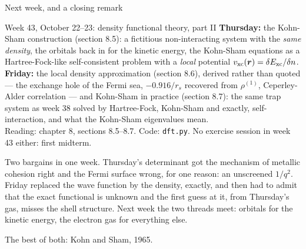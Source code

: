 \documentclass[aspectratio=169,10pt]{beamer}
\begin{document}
\begin{frame}{Next week, and a closing remark}
  \begin{exampleblock}{Week 43, October 22--23: density functional theory, part II}
    \small
    \textbf{Thursday:} the Kohn-Sham construction (section 8.5): a fictitious non-interacting system with the \emph{same density}, the orbitals back in for the kinetic energy, the Kohn-Sham equations as a Hartree-Fock-like self-consistent problem with a \emph{local} potential $v_{\rm xc}(\bm r)=\delta E_{\rm xc}/\delta n$.\\
    \textbf{Friday:} the local density approximation (section 8.6), derived rather than quoted --- the exchange hole of the Fermi sea, $-0.916/r_s$ recovered from $\rho^{(1)}$, Ceperley-Alder correlation --- and Kohn-Sham in practice (section 8.7): the same trap system as week 38 solved by Hartree-Fock, Kohn-Sham and exactly, self-interaction, and what the Kohn-Sham eigenvalues mean.\\
    Reading: chapter 8, sections 8.5--8.7. Code: \texttt{dft.py}. \alert{No exercise session in week 43 either: first midterm.}
  \end{exampleblock}
  \vspace{0.5em}
  \small
  Two bargains in one week. Thursday's determinant got the mechanism of metallic cohesion right and the Fermi surface wrong, for one reason: an unscreened $1/q^2$. Friday replaced the wave function by the density, exactly, and then had to admit that the exact functional is unknown and the first guess at it, from Thursday's gas, misses the shell structure. Next week the two threads meet: orbitals for the kinetic energy, the electron gas for everything else.
  \vspace{0.4em}

  \centering\alert{The best of both: Kohn and Sham, 1965.}
\end{frame}
\end{document}
